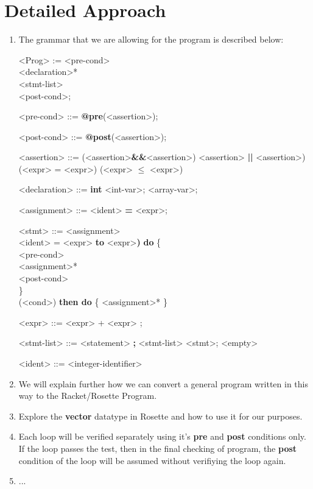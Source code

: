 \documentclass[letterpaper]{article} %
\begin{document}
\section {Detailed Approach}
\setlength{\grammarparsep}{20pt plus 1pt minus 1pt} %
\setlength{\grammarindent}{12em} %

\begin{enumerate}
	\item The grammar that we are allowing for the program is described below:
	\begin{grammar}
		<Prog> := <pre-cond>\\
						<declaration>*\\
						<stmt-list>\\
						<post-cond>;
		
		<pre-cond> ::= {\bf @pre}(<assertion>);
		
		<post-cond> ::= {\bf @post}(<assertion>);
		
		<assertion> ::= (<assertion>{\bf \&\&}<assertion>)
								\alt <assertion> \textbf{ || }<assertion>)
								\alt (<expr> = <expr>)
								\alt (<expr>  $\le$  <expr>)
								
								
		
		<declaration>  ::= {\bf int} <int-var>;
								 <array-var>;
		
		<assignment>  ::= <ident> {\bf =} <expr>;		
					
		<stmt> ::= <assignment>\\
		<ident> = <expr> {\bf to} <expr>{\bf )} {\bf do} 
		\{\\
		<pre-cond>\\
		<assignment>*\\
		<post-cond>\\
		\}\\
		 (<cond>) {\bf then do}
	    \{
	    <assignment>*
	    \}
	    
	    <expr> ::=  <expr> + <expr>
    					\alt <array-var>[<expr>];
    					\alt <int-var>
    					
		<stmt-list> ::= <statement> {\bf ;} <stmt-list> 
						\alt <stmt>;
						\alt <empty>
		
		<ident>   ::= <integer-identifier>
		\\
	\end{grammar}

	\item We will explain further how we can convert a general program written in this way to the Racket/Rosette Program. 
	
	\item Explore the {\bf vector} datatype in Rosette and how to use it for our purposes. 
	
	\item Each loop will be verified separately using it's {\bf pre} and {\bf post} conditions only. If the loop passes the test, then in the final checking of program, the {\bf post} condition of the loop will be assumed without verifiying the loop again. 
	
	\item ...
\end{enumerate}
\end{document}
